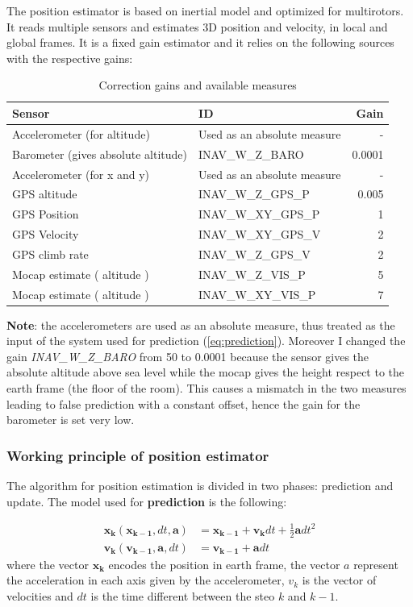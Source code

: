 The position estimator is based on inertial model and optimized for multirotors. It reads multiple sensors and estimates 3D position and velocity, in local and global frames. It is a fixed gain estimator and it relies on the following sources with the respective gains:
\begin{table}[H]
		\centering
	\begin{tabular}{l l r}
		\textbf{Sensor} & \textbf{ID} & \textbf{Gain} \\ \hline
		Accelerometer (for altitude) & Used as an absolute measure & - \\
		Barometer (gives absolute altitude)  & INAV\_W\_Z\_BARO & 0.0001  \\
		Accelerometer (for x and y) & Used as an absolute measure & - \\
		GPS altitude & INAV\_W\_Z\_GPS\_P & 0.005 \\
		GPS Position & INAV\_W\_XY\_GPS\_P & 1 \\
		GPS Velocity & INAV\_W\_XY\_GPS\_V & 2 \\
	    GPS climb rate & INAV\_W\_Z\_GPS\_V & 2 \\	
		Mocap estimate ( altitude ) & INAV\_W\_Z\_VIS\_P & 5 \\
		Mocap estimate ( altitude ) & INAV\_W\_XY\_VIS\_P & 7 \\
	\end{tabular}
	\caption{Correction gains and available measures}
	\label{tab:corrgain}
\end{table}
\noindent
\textbf{Note}: the accelerometers are used as an absolute measure, thus treated as the input of the system used for prediction (\eqref{eq:prediction}). Moreover I changed the gain \textit{INAV\_W\_Z\_BARO} from 50 to 0.0001 because the sensor gives the absolute altitude above sea level while the mocap gives the height respect to the earth frame (the floor of the room). This causes a mismatch in the two measures leading to false prediction with a constant offset, hence the gain for the barometer is set very low.

\subsubsection*{Working principle of position estimator}
The algorithm for position estimation is divided in two phases: prediction and update. The model used for \textbf{prediction} is the following: 

\begin{equation}
	\begin{aligned}
	\boldsymbol{x_k}(\boldsymbol{x_{k-1}}, dt , \boldsymbol{a})& = \boldsymbol{x_{k-1}} + \boldsymbol{v_k}dt + \frac{1}{2}\boldsymbol{a} dt^2 \\
	 \boldsymbol{v_k} ( \boldsymbol{v_{k-1}} ,\boldsymbol{a} , dt)& = \boldsymbol{v_{k-1}} + \boldsymbol{a}dt
	\end{aligned}
	\label{eq:prediction}
\end{equation}
where the vector $\boldsymbol{x_k}$ encodes the position in earth frame, the vector $a$ represent the acceleration in each axis given by the accelerometer, $v_k$ is the vector of velocities and $dt$ is the time different between the steo $k$ and $k-1$.\\


